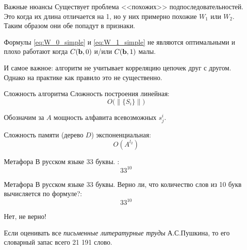 \begin{frame}{Важные нюансы}
	Существует проблема <<похожих>> подпоследовательностей.
	Это когда их длина отличается на 1, но у них примерно похожие $W_1$ или $W_2$.
	Таким образом они обе попадут в признаки. 
	
	Формулы \eqref{eq:W_0_simple} и \eqref{eq:W_1_simple} не являются оптимальными 
	и плохо работают когда $C(\bold b, 0)$ и/или $C(\bold b, 1)$ малы.
	
	И самое важное: алгоритм не учитывает корреляцию цепочек друг с другом. 
	Однако на практике как правило это не существенно. 
\end{frame}

\begin{frame}{Сложность алгоритма}
	Сложность построения линейная:
	\begin{equation}
	O \big( \lVert \{ S_i\} \rVert \big)
	\end{equation}
	
	Обозначим за $A$ мощность алфавита всевозможных $s_j^i$.
	 
	Сложность памяти (дерево $D$) экспоненциальная: 
	\begin{equation}
	O(A^{l_2})
	\end{equation}
	
\end{frame}

\begin{frame}{Метафора}
	В русском языке 33 буквы. :
	\begin{equation*}
	33^{10}
	\end{equation*}
	
	\LARGE
	\centering
\end{frame}

\begin{frame}{Метафора}
	В русском языке 33 буквы. Верно ли, что количество слов из 10
	букв вычисляется по формуле?:
	\begin{equation*}
	33^{10}
	\end{equation*}
	
	Нет, не верно! 
	
	Если оценивать все \textit{письменные литературные труды} А.С.Пушкина,
	то его словарный запас всего 21 191 слово.
\end{frame}

